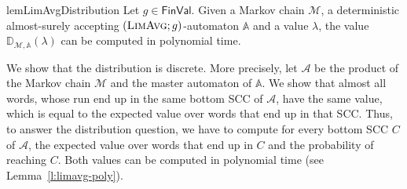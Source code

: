\documentclass{lmcs}
\newcommand{\proofideas}{\smallskip\noindent{\emph{The key ideas.}}}
\newcommand{\nestedA}{\mathbb{A}}
\newcommand{\flimavg}{\textsc{LimAvg}}
\newcommand{\aut}{\mathcal{A}}
\newcommand{\const}{\lambda}
\newcommand{\FinVal}{\mathsf{FinVal}}
\newcommand{\distrib}{\mathbb{D}}
\newcommand{\markov}{\mathcal{M}}
\begin{document}
\begin{restatable}{lem}{LimAvgDistribution}\label{l:limavg-dist-poly}
Let $g \in \FinVal$.
Given a Markov chain $\markov$, a deterministic almost-surely accepting  $(\flimavg; g)$-automaton $\nestedA$ and a value $\const$,
the value $\distrib_{\markov,\nestedA}(\const)$ can be computed in polynomial time.
\end{restatable}

\proofideas{}
We show that the distribution is discrete. More precisely,
let $\aut$ be the product of the Markov chain $\markov$ and the master automaton of $\nestedA$.
We show that almost all words, whose run end up in the same bottom SCC of $\aut$,
have the same value, which is equal to the expected value over words that end up in that SCC\@.
Thus, to answer the distribution question, we have to
compute for every bottom SCC $C$ of $\aut$, the expected value over words that end up
in $C$ and the probability of reaching $C$.
Both values can be computed in polynomial time (see Lemma~\ref{l:limavg-poly}).
\end{document}
